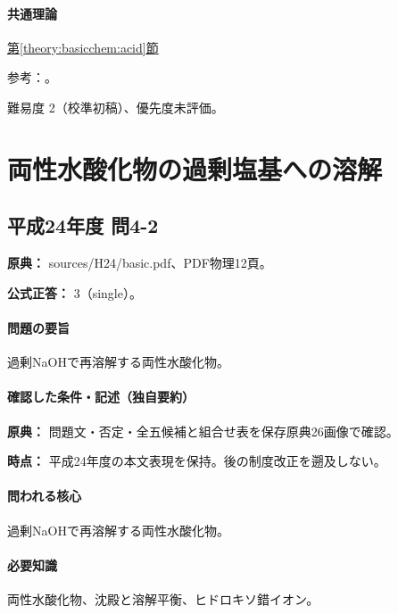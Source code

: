 \paragraph{共通理論} \hyperref[theory:basicchem:acid]{第\ref*{theory:basicchem:acid}節}

\par 参考：\cite{purdue_acid_strength,yale_hydrohalic}。

\par 難易度 2（校準初稿）、優先度未評価。

\section{両性水酸化物の過剰塩基への溶解}

\subsection{平成24年度 問4-2}
\label{q:h24-reg-basic-4-2}

\noindent\textbf{原典：} sources/H24/basic.pdf、PDF物理12頁。

\textbf{公式正答：} 3（single）。

\paragraph{問題の要旨} 過剰NaOHで再溶解する両性水酸化物。

\paragraph{確認した条件・記述（独自要約）}\mbox{}\par

\noindent\textbf{原典：} 問題文・否定・全五候補と組合せ表を保存原典26画像で確認。\par

\noindent\textbf{時点：} 平成24年度の本文表現を保持。後の制度改正を遡及しない。\par

\paragraph{問われる核心} 過剰NaOHで再溶解する両性水酸化物。

\paragraph{必要知識} 両性水酸化物、沈殿と溶解平衡、ヒドロキソ錯イオン。

